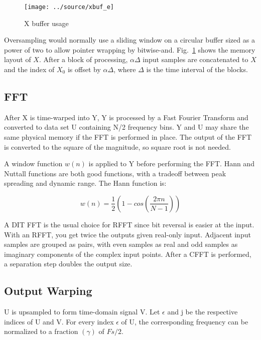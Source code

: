 \begin{figure}
    \centering
    \texttt{[image: ../source/xbuf\_e]}
    \caption[X buffer usage]{X buffer usage}
    \label{fig:xbuf}
\end{figure}

Oversampling would normally use a sliding window on a circular buffer sized as
a power of two to allow pointer wrapping by bitwise-and.
Fig.~\ref{fig:xbuf} shows the memory layout of $X$.
After a block of processing, $\alpha\Delta$ input samples are concatenated to
$X$ and the index of $X_0$ is offset by $\alpha\Delta$,
where $\Delta$ is the time interval of the blocks.

\subsection{FFT}

After X is time-warped into Y, Y is processed by a Fast Fourier Transform and
converted to data set U containing N/2 frequency bins. Y and U may share the
same physical memory if the FFT is performed in place.
The output of the FFT is converted to the square of the magnitude,
so square root is not needed.

A window function $w(n)$ is applied to Y before performing the FFT.
Hann and Nuttall functions are both good functions, with a tradeoff between
peak spreading and dynamic range. The Hann function is:

\begin{equation}
w(n) = \frac{1}{2}\left(1 - cos\left( \frac{2\pi n}{N-1} \right)\right)
\end{equation}

A DIT FFT is the usual choice for RFFT since bit reversal is easier at the input.
With an RFFT, you get twice the outputs given real-only input.
Adjacent input samples are grouped as pairs, with even samples as real and odd
samples as imaginary components of the complex input points.
After a CFFT is performed, a separation step doubles the output size.

\subsection{Output Warping}

U is upsampled to form time-domain signal V.
Let $\epsilon$ and j be the respective indices of U and V.
For every index $\epsilon$ of U, the corresponding frequency can be normalized
to a fraction $(\gamma)$ of $Fs/2$.

